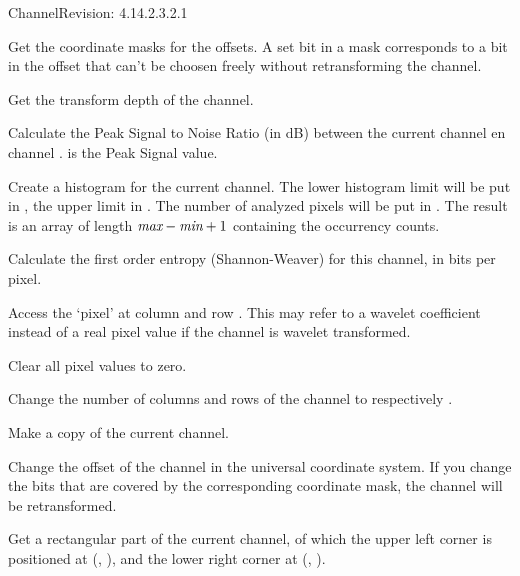 \begin{manpage}{\libtitle}{Channel}{$ $Revision: 4.14.2.3.2.1 $ $}

\subtitle{Virtual \\ Operations}

    Get the coordinate masks for the offsets. A set bit in a mask corresponds
    to a bit in the offset that can't be choosen freely without retransforming
    the channel.

    Get the transform depth of the channel.

    Calculate the Peak Signal to Noise Ratio (in dB) between the current
    channel en channel .  is the Peak Signal value.

    Create a histogram for the current channel. The lower histogram limit will
    be put in , the upper limit in . The number of analyzed
    pixels will be put in . The result is an array of length
    $\emph{max}-\emph{min}+1$ containing the occurrency counts.

    Calculate the first order entropy (Shannon-Weaver) for this channel,
    in bits per pixel.

    Access the `pixel' at column  and row . This may refer to
    a wavelet coefficient instead of a real pixel value if the channel is
    wavelet transformed.

    Clear all pixel values to zero.

    Change the number of columns and rows of the channel to
     respectively .

    Make a copy of the current channel.

    Change the offset of the channel in the universal coordinate system. If
    you change the bits that are covered by the corresponding coordinate mask,
    the channel will be retransformed.

    Get a rectangular part of the current channel, of which the upper left
    corner is positioned at (, ), and the lower right corner
    at (, ).


\end{manpage}
